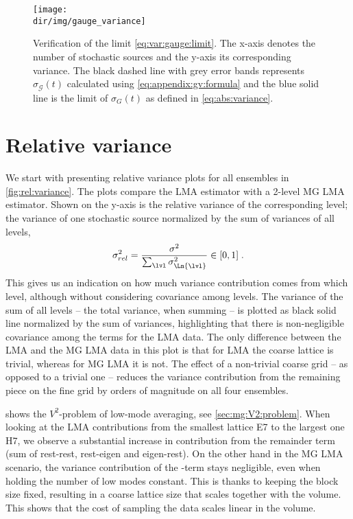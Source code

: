 \begin{figure}
\centering
\texttt{[image: \\dir/img/gauge\_variance]}
\caption{
Verification of the limit \cref{eq:var:gauge:limit}.
The x-axis denotes the number of stochastic sources and the y-axis its corresponding variance.
The black dashed line with grey error bands represents $\sigma_{\mathcal{G}}(t)$ calculated using \cref{eq:appendix:gv:formula} and the blue solid line is the limit of $\sigma_{G}(t)$ as defined in \cref{eq:abs:variance}.
\takenfull
}
\label{fig:gauge:variance}
\end{figure}

\section{Relative variance}
\label{sec:numerics:rel:variance}

We start with presenting relative variance plots for all ensembles in \cref{fig:rel:variance}.
The plots compare the LMA estimator with a 2-level MG LMA estimator.
Shown on the y-axis is the relative variance of the corresponding level; the variance of one stochastic source normalized by the sum of variances of all levels, \ie
\begin{equation} \label{eq:rel:variance}
\sigma_{rel}^{2} = \frac{\sigma^{2}}{ \sum_{\lvl} \sigma_{\Ln{\lvl}}^{2} } \in [0, 1] \;.
\end{equation}
This gives us an indication on how much variance contribution comes from which level, although without considering covariance among levels.
The variance of the sum of all levels -- the total variance, when summing -- is plotted as black solid line normalized by the sum of variances, highlighting that there is non-negligible covariance among the terms for the LMA data.
The only difference between the LMA and the MG LMA data in this plot is that for LMA the  coarse lattice is trivial, whereas for MG LMA it is not.
The effect of a non-trivial coarse grid -- as opposed to a trivial one -- reduces the variance contribution from the remaining piece on the fine grid by orders of magnitude on all four ensembles.

 shows the $V^{2}$-problem of low-mode averaging, see \cref{sec:mg:V2:problem}.
When looking at the LMA contributions from the smallest lattice E7 to the largest one H7, we observe a substantial increase in contribution from the remainder term (sum of rest-rest, rest-eigen and eigen-rest).
On the other hand in the MG LMA scenario, the variance contribution of the -term stays negligible, even when holding the number of low modes constant.
This is thanks to keeping the block size fixed, resulting in a coarse lattice size that scales together with the volume.
This shows that the cost of sampling the data scales linear in the volume.

